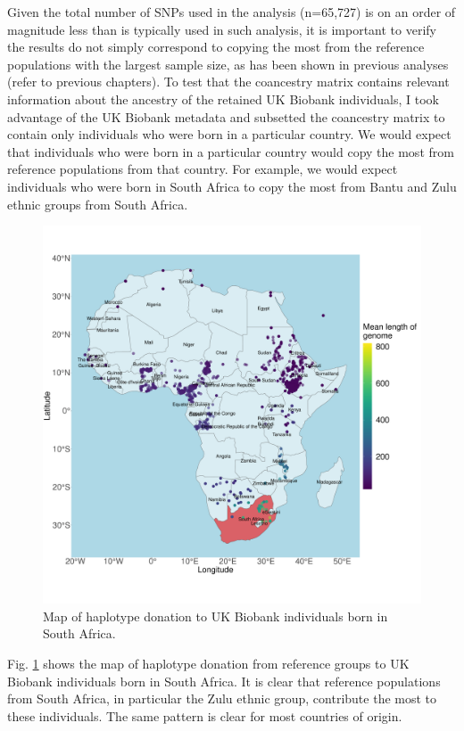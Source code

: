 Given the total number of SNPs used in the analysis (n=65,727) is on an order of magnitude less than is typically used in such analysis, it is important to verify the results do not simply correspond to copying the most from the reference populations with the largest sample size, as has been shown in previous analyses (refer to previous chapters). To test that the coancestry matrix contains relevant information about the ancestry of the retained UK Biobank individuals, I took advantage of the UK Biobank metadata and subsetted the coancestry matrix to contain only individuals who were born in a particular country. We would expect that individuals who were born in a particular country would copy the most from reference populations from that country. For example, we would expect individuals who were born in South Africa to copy the most from Bantu and Zulu ethnic groups from South Africa. 

\begin{figure}[htp]
    \centering
    \includegraphics[width=1.0\textwidth]{../images/chapter3/haplotype_map_SouthAfrica.pdf}
    \caption{Map of haplotype donation to UK Biobank individuals born in South Africa.}
    \label{fig:haplotype_map_South Africa}
\end{figure}

Fig. \ref{fig:haplotype_map_South Africa} shows the map of haplotype donation from reference groups to UK Biobank individuals born in South Africa. It is clear that reference populations from South Africa, in particular the Zulu ethnic group, contribute the most to these individuals. The same pattern is clear for most countries of origin. 

